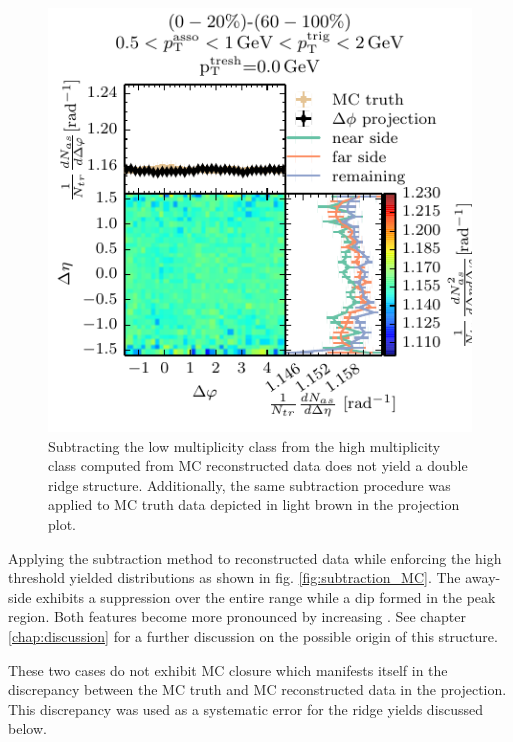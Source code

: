 \begin{figure}
  \centering
  \includegraphics[]{figures/05_12_sub_mc_thresh_00.pdf}
  \caption[Subtracting the low multiplicity class from the high multiplicity class computed from MC reconstructed data.]{Subtracting the low multiplicity class from the high multiplicity class computed from MC reconstructed data does not yield a double ridge structure. Additionally, the same subtraction procedure was applied to MC truth data depicted in light brown in the \dphi projection plot. }
  \label{fig:subtraction_MC_no_thresh}
\end{figure}

Applying the subtraction method to reconstructed data while enforcing the high \pt threshold yielded distributions as shown in fig. \ref{fig:subtraction_MC}. The \gls{away-side} exhibits a suppression over the entire \deta range while a dip formed in the peak region. Both features become more pronounced by increasing  \ptthresh. See chapter \ref{chap:discussion} for a further discussion on the possible origin of this structure.

These two cases do not exhibit MC closure which manifests itself in the discrepancy between the MC truth and MC reconstructed data in the \dphi projection. This discrepancy was used as a systematic error for the ridge yields discussed below.

